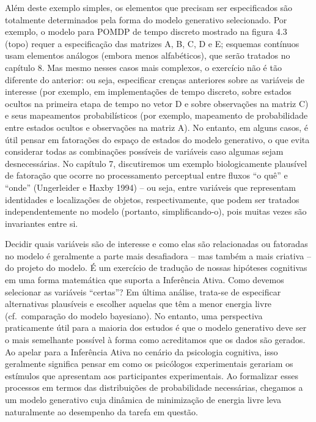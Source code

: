 \documentclass[
  12pt,
]{book}
\begin{document}
Além deste exemplo simples, os elementos que precisam ser especificados são totalmente determinados pela forma do modelo generativo selecionado. Por exemplo, o modelo para POMDP de tempo discreto mostrado na figura 4.3 (topo) requer a especificação das matrizes A, B, C, D e E; esquemas contínuos usam elementos análogos (embora menos alfabéticos), que serão tratados no capítulo 8. Mas mesmo nesses casos mais complexos, o exercício não é tão diferente do anterior: ou seja, especificar crenças anteriores sobre as variáveis \hspace{0pt}\hspace{0pt}de interesse (por exemplo, em implementações de tempo discreto, sobre estados ocultos na primeira etapa de tempo no vetor D e sobre observações na matriz C) e seus mapeamentos probabilísticos (por exemplo, mapeamento de probabilidade entre estados ocultos e observações na matriz A). No entanto, em alguns casos, é útil pensar em fatorações do espaço de estados do modelo generativo, o que evita considerar todas as combinações possíveis de variáveis \hspace{0pt}\hspace{0pt}caso algumas sejam desnecessárias. No capítulo 7, discutiremos um exemplo biologicamente plausível de fatoração que ocorre no processamento perceptual entre fluxos ``o quê'' e ``onde'' (Ungerleider e Haxby 1994) -- ou seja, entre variáveis \hspace{0pt}\hspace{0pt}que representam identidades e localizações de objetos, respectivamente, que podem ser tratados independentemente no modelo (portanto, simplificando-o), pois muitas vezes são invariantes entre si.

Decidir quais variáveis \hspace{0pt}\hspace{0pt}são de interesse e como elas são relacionadas ou fatoradas no modelo é geralmente a parte mais desafiadora -- mas também a mais criativa -- do projeto do modelo. É um exercício de tradução de nossas hipóteses cognitivas em uma forma matemática que suporta a Inferência Ativa. Como devemos selecionar as variáveis \hspace{0pt}\hspace{0pt}``certas''? Em última análise, trata-se de especificar alternativas plausíveis e escolher aquelas que têm a menor energia livre (cf.~comparação do modelo bayesiano). No entanto, uma perspectiva praticamente útil para a maioria dos estudos é que o modelo generativo deve ser o mais semelhante possível à forma como acreditamos que os dados são gerados. Ao apelar para a Inferência Ativa no cenário da psicologia cognitiva, isso geralmente significa pensar em como os psicólogos experimentais gerariam os estímulos que apresentam aos participantes experimentais. Ao formalizar esses processos em termos das distribuições de probabilidade necessárias, chegamos a um modelo generativo cuja dinâmica de minimização de energia livre leva naturalmente ao desempenho da tarefa em questão.
\end{document}
